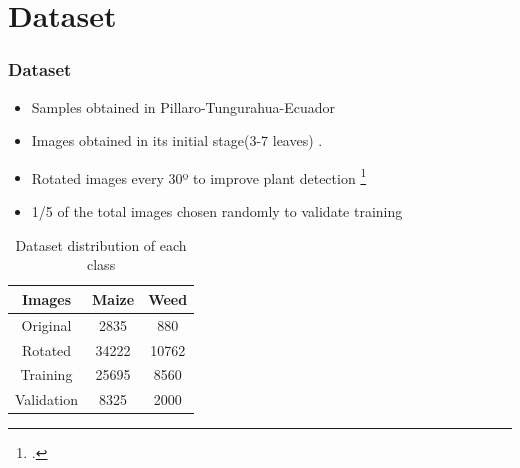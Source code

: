 \documentclass[10pt,a4paper]{beamer}
\begin{document}
\section{Dataset}
\begin{frame}
\frametitle{Dataset}
\begin{itemize}
\item Samples obtained in Pillaro-Tungurahua-Ecuador
\item Images obtained in its initial stage(3-7 leaves) . %
\item Rotated images every 30º to improve plant detection 
\footcite{sladojevic2016deep}%
\item 1/5 of the total images chosen randomly to validate training%
\end{itemize}
\begin{table}[h!]
\renewcommand{\arraystretch}{1.3}
\caption{Dataset distribution of each class}
\label{table:1}
\centering
\begin{tabular}{| c c c |} 
 \hline
 \textbf{Images} & \textbf{Maize} & \textbf{Weed}  \\ [1ex] 
 \hline
 Original  & 2835 & 880 \\ 
 Rotated & 34222 & 10762 \\ 
 Training & 25695 & 8560 \\
 Validation & 8325 & 2000 \\
 \hline
\end{tabular}
\end{table}
\end{frame}

\end{document}
